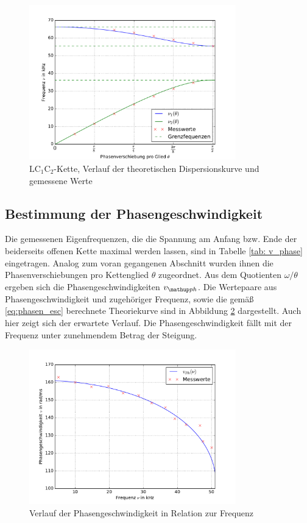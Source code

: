 \begin{figure}
  \centering
  \includegraphics[width = 0.8\textwidth]{../Messdaten/plots/dispersion1.pdf}
  \caption{$\mathup{LC_1C_2}$-Kette, Verlauf der theoretischen Dispersionskurve und gemessene Werte}
  \label{fig: dispersion_LC1C2}
\end{figure}
\FloatBarrier


\subsection{Bestimmung der Phasengeschwindigkeit}
Die gemessenen Eigenfrequenzen, die die Spannung am Anfang bzw. Ende der beiderseits
offenen Kette maximal werden lassen, sind in Tabelle \ref{tab: v_phase} eingetragen. Analog zum
voran gegangenen Abschnitt wurden ihnen die Phasenverschiebungen pro Kettenglied $\theta$
zugeordnet. Aus dem Quotienten $\omega / \theta$ ergeben sich die Phasengeschwindigkeiten $v\ua{ph}$.
Die Wertepaare aus Phasengeschwindigkeit und zugehöriger Frequenz, sowie die gemäß \eqref{eq:phasen_esc} berechnete
Theoriekurve sind in Abbildung \ref{fig: v_phase} dargestellt. Auch hier zeigt sich der erwartete Verlauf. Die Phasengeschwindigkeit
fällt mit der Frequenz unter zunehmendem Betrag der Steigung.

\begin{figure}
  \centering
  \includegraphics[width = 0.8\textwidth]{../Messdaten/plots/v_phase.pdf}
  \caption{Verlauf der Phasengeschwindigkeit in Relation zur Frequenz}
  \label{fig: v_phase}
\end{figure}


